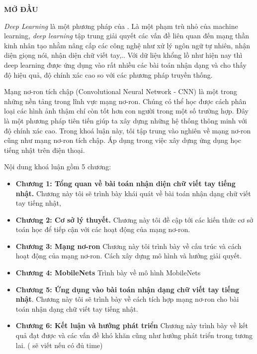 \begin{center}
	\textbf{MỞ ĐẦU}
\end{center}

\par
\textit{Deep Learning} là một phương pháp của . Là một phạm trù nhỏ của machine learning, \textit{deep learning} tập trung giải quyết các vấn đề liên quan đến mạng thần kinh nhân tạo nhằm nâng cấp các công nghệ như xử lý ngôn ngữ tự nhiên, nhận diện giọng nói, nhận diện chữ viết tay,.. Với dữ liệu khổng lồ như hiện nay thì deep learning được ứng dụng vào rất nhiều các bài toán nhận dạng và cho thấy độ hiệu quả, độ chính xác cao so với các phương pháp truyền thống. \par

Mạng nơ-ron tích chập (Convolutional Neural Network - CNN) là một trong những nền tảng trong lĩnh vực mạng nơ-ron. Chúng có thể học được cách phân loại các hình ảnh thậm chí còn tốt hơn con người trong một số trường hợp. Đây là một phương pháp tiên tiến giúp ta xây dựng những hệ thống thông minh với độ chính xác cao. Trong khoá luận này, tôi tập trung vào nghiên về mạng nơ-ron cũng như mạng nơ-ron tích chập. Áp dụng trong việc xây dựng ứng dụng học tiếng nhật trên điện thoại. \par
Nội dung khoá luận gồm 5 chương:

\begin{itemize}
\item[] \textbf{Chương 1: Tổng quan về bài toán nhận diện chữ viết tay tiếng nhật.} Chương này tôi sẽ trình bày khái quát về bài toán nhận dạng chữ viết tay tiếng nhật, 
\item[] \textbf{Chương 2: Cơ sở lý thuyết.} Chương này tôi đề cập tới các kiến thức cơ sở toán học để tiếp cận với các hoạt động của mạng nơ-ron.
\item[] \textbf{Chương 3: Mạng nơ-ron} Chương này tôi trình bày về cấu trúc và cách hoạt động của mạng nơ-ron. Cách xây dựng mô hình và hướng giải quyết.
\item[] \textbf{Chương 4: MobileNets} Trình bày về mô hình MobileNets
\item[] \textbf{Chương 5: Ứng dụng vào bài toán nhận dạng chữ viết tay tiếng nhật}. Chương này tôi sẽ trình bày về cách tích hợp mạng nơ-ron cho bài toán nhận dạng chữ viết tay tiếng nhật.
\item[] \textbf{Chương 6: Kết luận và hướng phát triển} Chương này trình bày về kết quả đạt được và các vấn đề khó khăn cũng như hướng phát triển trong tương lai. ( sẽ viết nếu có đủ time)
\end{itemize}

